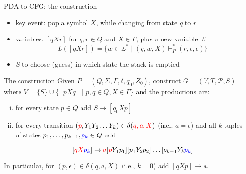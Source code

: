 \documentclass[handout]{beamer}
\begin{document}
\begin{frame}{PDA to CFG: the construction}

    \vspace{-6pt}
    \begin{itemize}
        \item key event: pop a symbol $X$, while changing from state $q$ to $r$
        \item variables: $[qXr]$ for $q,r\in Q$ and $X\in \Gamma$, plus a new variable~$S$
        $$
        L([qXr])=\{w\in\Sigma^*\mid (q,w,X)\vdash_P^*(r,\epsilon,\epsilon)\}
        $$
        \item $S$ to choose (guess) in which state the stack is emptied
    \end{itemize}

    \begin{block}{The construction}
        Given $P=(Q,\Sigma,\Gamma,\delta,q_0,Z_0)$, construct $G=(V,T,\mathcal P,S)$ where $V=\{S\}\cup\{[pXq]\mid p,q\in Q,X\in\Gamma\}$ and the productions are:   
        \begin{enumerate}[(i)]
            \item for every state $p\in Q$ add $S\to [q_0Xp]$ 
            \item for every transition $({\color{red}p},Y_1Y_2\ldots Y_k)\in\delta({\color{red}q,a,X})$ (incl. $a=\epsilon$) and \alert{all $k$-tuples of states} $p_1,\dots,p_{k-1},{\color{blue}p_k}\in Q$ add
            
            \vspace{-6pt}
            $$
            [{\color{red}qX}{\color{blue}p_k}]\rightarrow {\color{red}a}[{\color{red}p}Y_1p_1][p_1Y_2p_2]\ldots [p_{k-1}Y_k{\color{blue}p_k}]
            $$                  
        \end{enumerate}        
        In particular, for $(p,\epsilon)\in\delta(q,a,X)$ (i.e., $k=0$) add $[qXp]\rightarrow a$.
    \end{block}

\end{frame}
\end{document}
